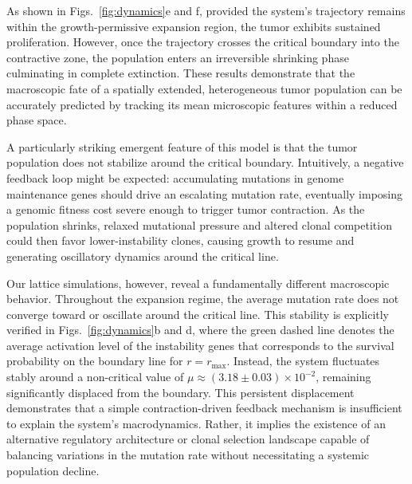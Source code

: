 \documentclass[10pt, aps, rmp,  twocolumn, superscriptaddress, floatfix, showkeys]{revtex4-2}
\begin{document}
As shown in Figs.~\ref{fig:dynamics}e and f, provided the system's trajectory remains within the growth-permissive expansion region, the tumor exhibits sustained proliferation. However, once the trajectory crosses the critical boundary into the contractive zone, the population enters an irreversible shrinking phase culminating in complete extinction. These results demonstrate that the macroscopic fate of a spatially extended, heterogeneous tumor population can be accurately predicted by tracking its mean microscopic features within a reduced phase space.

A particularly striking emergent feature of this model is that the tumor population does not stabilize around the critical boundary. Intuitively, a negative feedback loop might be expected: accumulating mutations in genome maintenance genes should drive an escalating mutation rate, eventually imposing a genomic fitness cost severe enough to trigger tumor contraction. As the population shrinks, relaxed mutational pressure and altered clonal competition could then favor lower-instability clones, causing growth to resume and generating oscillatory dynamics around the critical line.

Our lattice simulations, however, reveal a fundamentally different macroscopic behavior. Throughout the expansion regime, the average mutation rate does not converge toward or oscillate around the critical line. This stability is explicitly verified in Figs.~\ref{fig:dynamics}b and d, where the green dashed line denotes the average activation level of the instability genes that corresponds to the survival probability on the boundary line for $r=r_{\text{max}}$. Instead, the system fluctuates stably around a non-critical value of $\mu \approx (3.18 \pm 0.03) \times 10^{-2}$, remaining significantly displaced from the boundary. This persistent displacement demonstrates that a simple contraction-driven feedback mechanism is insufficient to explain the system's macrodynamics. Rather, it implies the existence of an alternative regulatory architecture or clonal selection landscape capable of balancing variations in the mutation rate without necessitating a systemic population decline.
\end{document}
